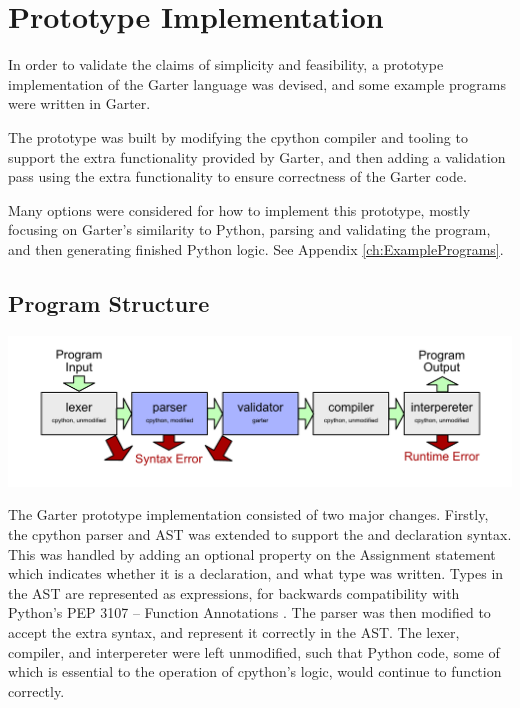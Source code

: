 \glsresetall %
\chapter{Prototype Implementation}\label{ch:Prototype}

In order to validate the claims of simplicity and feasibility, a prototype
implementation of the Garter language was devised, and some example
programs were written in Garter.

The prototype was built by modifying the cpython compiler \cite{cpython} and
tooling to support the extra functionality provided by Garter, and then adding a
validation pass using the extra functionality to ensure correctness of the
Garter code.

Many options were considered for how to implement this prototype, mostly
focusing on Garter's similarity to Python, parsing and validating the program,
and then generating finished Python logic. See
Appendix \ref{ch:ExamplePrograms}.

\section{Program Structure}

\includegraphics[width=\textwidth]{figs/proto_design.pdf}

The Garter prototype implementation consisted of two major changes. Firstly, the
cpython parser and AST was extended to support the \code{:=} and 
declaration syntax. This was handled by adding an optional property on the
Assignment statement which indicates whether it is a declaration, and what type
was written. Types in the AST are represented as expressions, for backwards
compatibility with Python's PEP 3107 -- Function
Annotations \cite{pythonfuncannot}. The parser was then modified to accept the
extra syntax, and represent it correctly in the AST. The lexer, compiler, and
interpereter were left unmodified, such that Python code, some of which is
essential to the operation of cpython's logic, would continue to function
correctly.

